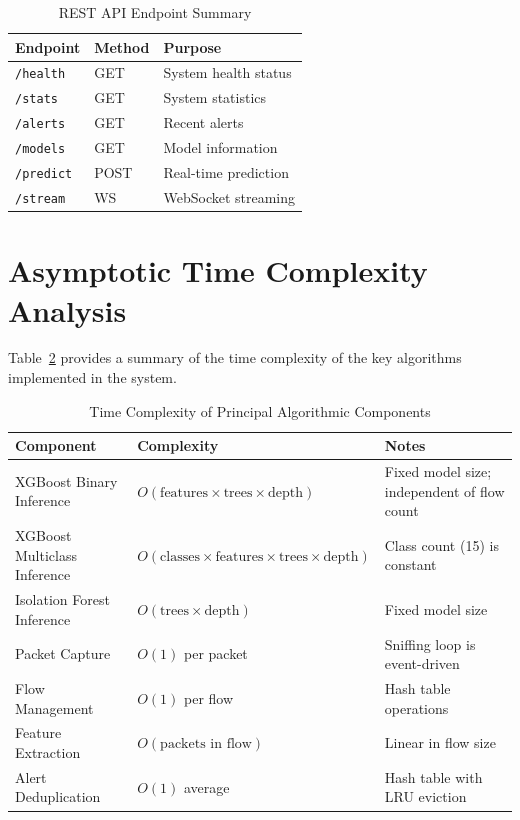 \documentclass[12pt,a4paper]{report}
\begin{document}
\begin{table}[htbp]
\centering
\caption{REST API Endpoint Summary}
\label{tab:api_endpoint_summary}
\renewcommand{\arraystretch}{1.35}

\begin{tabularx}{\textwidth}{|p{3.2cm}|p{1.8cm}|X|}
\hline
\textbf{Endpoint} & \textbf{Method} & \textbf{Purpose} \\
\hline
\texttt{/health} & GET & System health status \\
\hline
\texttt{/stats} & GET & System statistics \\
\hline
\texttt{/alerts} & GET & Recent alerts \\
\hline
\texttt{/models} & GET & Model information \\
\hline
\texttt{/predict} & POST & Real-time prediction \\
\hline
\texttt{/stream} & WS & WebSocket streaming \\
\hline
\end{tabularx}
\end{table}

\section{Asymptotic Time Complexity Analysis}

Table~\ref{tab:time_complexity} provides a summary of the time complexity of the key algorithms implemented in the system.

\begin{table}[htbp]
\centering
\caption{Time Complexity of Principal Algorithmic Components}
\label{tab:time_complexity}
\renewcommand{\arraystretch}{1.5}

\begin{tabularx}{\textwidth}{|p{3.7cm}|p{3.0cm}|X|}
\hline
\textbf{Component} & \textbf{Complexity} & \textbf{Notes} \\
\hline
XGBoost Binary Inference & $O(\text{features} \times \text{trees} \times \text{depth})$ & Fixed model size; independent of flow count \\
\hline
XGBoost Multiclass Inference & $O(\text{classes} \times \text{features} \times \text{trees} \times \text{depth})$ & Class count (15) is constant \\
\hline
Isolation Forest Inference & $O(\text{trees} \times \text{depth})$ & Fixed model size \\
\hline
Packet Capture & $O(1)$ per packet & Sniffing loop is event-driven \\
\hline
Flow Management & $O(1)$ per flow & Hash table operations \\
\hline
Feature Extraction & $O(\text{packets in flow})$ & Linear in flow size \\
\hline
Alert Deduplication & $O(1)$ average & Hash table with LRU eviction \\
\hline
\end{tabularx}
\end{table}
\end{document}
